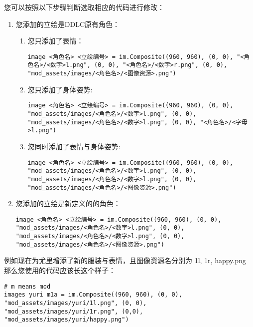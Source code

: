 您可以按照以下步骤判断选取相应的代码进行修改：
\begin{enumerate}
    \item 您添加的立绘是DDLC原有角色：
    \begin{enumerate}
        \item 您只添加了表情：
        \begin{lstlisting}[numbers=none]
image <角色名> <立绘编号> = im.Composite((960, 960), (0, 0), "<角色名>/<数字>l.png", (0, 0), "<角色名>/<数字>r.png", (0, 0), "mod_assets/images/<角色名>/<图像资源>.png") 
        \end{lstlisting}

        \item 您只添加了身体姿势:
        \begin{lstlisting}[numbers=none]
image <角色名> <立绘编号> = im.Composite((960, 960), (0, 0), "mod_assets/images/<角色名>/<数字>l.png", (0, 0), "mod_assets/images/<角色名>/<数字>l.png", (0, 0), "<角色名>/<字母>l.png") 
        \end{lstlisting}

        \item 您同时添加了表情与身体姿势:
        \begin{lstlisting}[numbers=none]
image <角色名> <立绘编号> = im.Composite((960, 960), (0, 0), "mod_assets/images/<角色名>/<数字>l.png", (0, 0), "mod_assets/images/<角色名>/<数字>l.png", (0, 0), "mod_assets/images/<角色名>/<图像资源>.png") 
        \end{lstlisting}
    \end{enumerate}

    \item 您添加的立绘是新定义的的角色：
    \begin{lstlisting}[numbers=none]
image <角色名> <立绘编号> = im.Composite((960, 960), (0, 0), "mod_assets/images/<角色名>/<数字>l.png", (0, 0), "mod_assets/images/<角色名>/<数字>l.png", (0, 0), "mod_assets/images/<角色名>/<图像资源>.png") 
    \end{lstlisting}
\end{enumerate}

例如现在为尤里增添了新的服装与表情，且图像资源名分别为 1l, 1r, happy.png
那么您使用的代码应该长这个样子：
\begin{lstlisting}
# m means mod
images yuri m1a = im.Composite((960, 960), (0, 0), "mod_assets/images/yuri/1l.png", (0, 0), "mod_assets/images/yuri/1r.png", (0,0), "mod_assets/images/yuri/happy.png")
\end{lstlisting}


